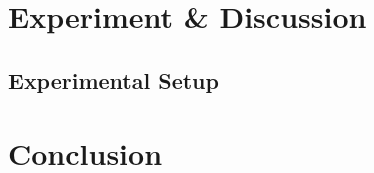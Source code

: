 \section{Experiment \& Discussion}
\label{sec:ExperimentDiscussion}

\subsection{Experimental Setup}
\label{sec:ExpSetup}

\section{Conclusion}
\label{sec:Conclusion}

